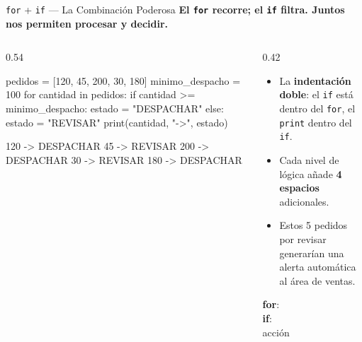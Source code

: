 \documentclass[aspectratio=169, 11pt]{beamer}
\begin{document}
\begin{frame}[fragile,shrink=30]{\texttt{for} + \texttt{if} — La Combinación Poderosa}
  \vspace{-6pt}
  {\small\color{arcaDark}\bfseries
    El \texttt{for} recorre; el \texttt{if} filtra.
    Juntos nos permiten procesar \textbf{y} decidir.}

  \vspace{4pt}
  \begin{columns}[T]
    \begin{column}{0.54\textwidth}
      \begin{pyblock}
pedidos = [120, 45, 200, 30, 180]
minimo_despacho = 100
for cantidad in pedidos:
    if cantidad >= minimo_despacho:
        estado = "DESPACHAR"
    else:
        estado = "REVISAR"
    print(cantidad, "->", estado)
      \end{pyblock}
      \vspace{-2pt}
      \begin{outputblock}
120 -> DESPACHAR
45  -> REVISAR
200 -> DESPACHAR
30  -> REVISAR
180 -> DESPACHAR
      \end{outputblock}
    \end{column}

    \begin{column}{0.42\textwidth}
      {\footnotesize\color{textMuted}
      \begin{itemize}\setlength{\itemsep}{5pt}
        \item[{\color{arcaRed}\scriptsize\faArrowRight}]
          La \textbf{indentación doble}: el
          \texttt{if} está dentro del \texttt{for},
          el \texttt{print} dentro del \texttt{if}.

        \item[{\color{arcaRed}\scriptsize\faArrowRight}]
          Cada nivel de lógica añade
          \textbf{4 espacios} adicionales.

        \item[{\color{arcaRed}\scriptsize\faLightbulb}]
          Estos 5 pedidos por revisar
          generarían una alerta automática
          al área de ventas.
      \end{itemize}

      \vspace{6pt}
      \begin{tcolorbox}[
        colback=arcaGray, colframe=arcaRed, boxrule=0pt, leftrule=3pt,
        arc=2pt, left=4pt, right=4pt, top=3pt, bottom=3pt
      ]
        {\scriptsize\ttfamily\color{textDark}
          \textbf{for}:\\ \hspace*{8pt}\textbf{if}:\\
          \hspace*{16pt}acción
        }
      \end{tcolorbox}
      }
    \end{column}
  \end{columns}
\end{frame}
\end{document}
